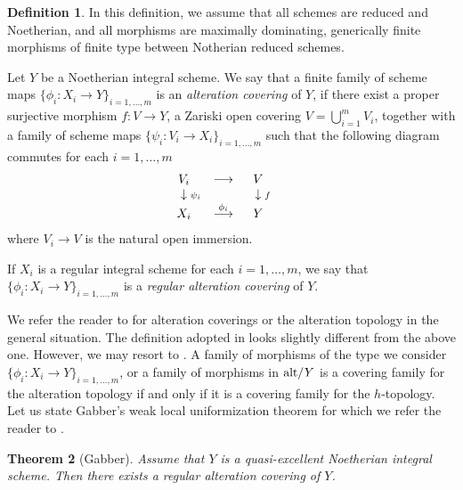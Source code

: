 \documentclass[11pt,a4paper]{amsart}
\newtheorem{theorem}{Theorem}[section]
\theoremstyle{definition}
\newtheorem{definition}[theorem]{Definition}
\theoremstyle{remark}
\begin{document}
\begin{definition}
In this definition, we assume that all schemes are reduced and Noetherian, and all morphisms are maximally dominating, generically finite morphisms of finite type between Notherian reduced schemes.

Let $Y$ be a Noetherian integral scheme. We say that a finite family of scheme maps $\{ \phi_i :X_i \to Y \}_{i=1,\ldots, m}$ is an \textit{alteration covering} of $Y$, 
if there exist a proper surjective morphism $f:V \to Y$, a Zariski open covering $V=\bigcup_{i=1}^m V_i$, together with a family of scheme maps $\{\psi_i:V_i \to X_i\}_{i=1,\ldots,m}$ such that the following diagram commutes for each $i= 1, \ldots,m$
\begin{equation}
\label{diagram}
\begin{array}{ccccc}
V_i & {\longrightarrow} & V &\\
\hphantom{\scriptstyle \psi_i}\downarrow{\scriptstyle \psi_i} &&  \hphantom{\scriptstyle f}\downarrow{\scriptstyle f}
& & \\
X_i & \stackrel{\phi_i}{\longrightarrow} & Y\\
\end{array}
\end{equation}
where $V_i \to V$ is the natural open immersion.

If $X_i$ is a regular integral scheme for each $i = 1,\ldots,m$, 
we say that $\{ \phi_i :X_i \to Y \}_{i = 1,\ldots,m}$ is a \textit{regular alteration covering} of $Y$.
\end{definition}



We refer the reader to \cite{Book} for alteration coverings or the alteration topology in the general situation. The definition adopted in \cite{Book} looks slightly different from the above one. However, we may resort to \cite[Th\'eor\`eme 3.2.1; EXPOS\'E II]{Book}. A family of morphisms of the type we consider $\{ \phi_i :X_i \to Y \}_{i=1,\ldots, m}$, or a family of morphisms in ${\rm alt}/Y$ is a covering family for the alteration topology if and only if it is a covering family for the $h$-topology. Let us state Gabber's weak local uniformization theorem for which we refer the reader to \cite{Book}.



\begin{theorem}[Gabber]
\label{Gabberuniformization}
Assume that $Y$ is a quasi-excellent Noetherian integral scheme. Then there exists a regular alteration covering of $Y$.
\end{theorem}
\end{document}
